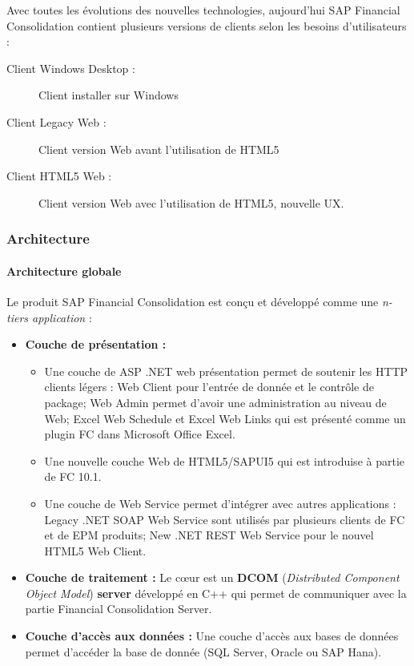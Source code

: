 \par Avec toutes les évolutions des nouvelles technologies, aujourd'hui SAP Financial Consolidation contient plusieurs versions de clients selon les besoins d'utilisateurs : 
    \begin{description}
        \item [Client Windows Desktop :] Client installer sur Windows
        \item [Client Legacy Web :] Client version Web avant l'utilisation de HTML5
        \item [Client HTML5 Web :] Client version Web avec l'utilisation de HTML5, nouvelle UX.
    \end{description}
    \subsubsection{Architecture}
    
    \paragraph{Architecture globale}
    Le produit SAP Financial Consolidation est conçu et développé comme une \textit{n-tiers application} :
    \begin{itemize}[label=\textbullet]
        \item \textbf{Couche de présentation :} 
            \begin{itemize}
                \item Une couche de ASP .NET web présentation permet de soutenir les HTTP clients légers : Web Client pour l'entrée de donnée et le contrôle de package; Web Admin permet d'avoir une administration au niveau de Web; Excel Web Schedule et Excel Web Links qui est présenté comme un plugin FC dans Microsoft Office Excel.
                \item Une nouvelle couche Web de HTML5/SAPUI5 qui est introduise à partie de FC 10.1.
                \item Une couche de Web Service permet d'intégrer avec autres applications : Legacy .NET SOAP Web Service sont utilisés par plusieurs clients de FC et de EPM produits; New .NET REST Web Service pour le nouvel HTML5 Web Client.
            \end{itemize}
        \item \textbf{Couche de traitement :} Le cœur est un \textbf{DCOM} (\textit{Distributed Component Object Model}) \textbf{server} développé en C++ qui permet de communiquer avec la partie Financial Consolidation Server.
        \item \textbf{Couche d'accès aux données :} Une couche d'accès aux bases de données permet d'accéder la base de donnée (SQL Server, Oracle ou SAP Hana).
    \end{itemize}
    
